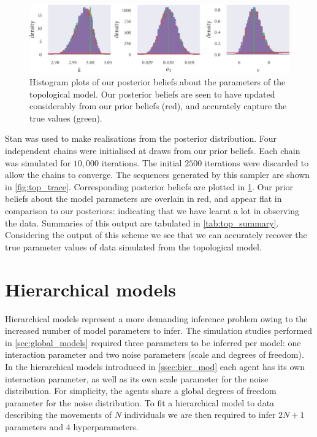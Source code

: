 \begin{figure}[tbp]
  \includegraphics{top_hist.pdf}
  \caption{Histogram plots of our posterior beliefs about the parameters of the
    topological model. Our posterior beliefs are seen to have updated considerably from our
    prior beliefs (red), and accurately capture the true values (green).}
    \label{fig:top_hist}
\end{figure}

Stan was used to make realisations from the posterior distribution. Four independent
chains were initialised at draws from our prior beliefs. Each chain was simulated for
$10,000$ iterations. The initial $2500$ iterations were discarded to allow the chains to
converge. The sequences generated by this sampler are shown in \cref{fig:top_trace}.
Corresponding posterior beliefs are plotted in \cref{fig:top_hist}. Our prior beliefs
about the model parameters are overlain in red, and appear flat in comparison to our
posteriors: indicating that we have learnt a lot in observing the data. Summaries of this
output are tabulated in \cref{tab:top_summary}. Considering the output of this scheme we
see that we can accurately recover the true parameter values of data simulated from the
topological model.

\section{Hierarchical models}

Hierarchical models represent a more demanding inference problem owing to the increased
number of model parameters to infer. The simulation studies performed in
\cref{sec:global_models} required three parameters to be inferred per model: one
interaction parameter and two noise parameters (scale and degrees of freedom). In the
hierarchical models introduced in \cref{ssec:hier_mod} each agent has its own interaction
parameter, as well as its own scale parameter for the noise distribution. For simplicity,
the agents share a global degrees of freedom parameter for the noise distribution. To fit
a hierarchical model to data describing the movements of $N$ individuals we are then
required to infer $2N+1$ parameters and $4$ hyperparameters.

